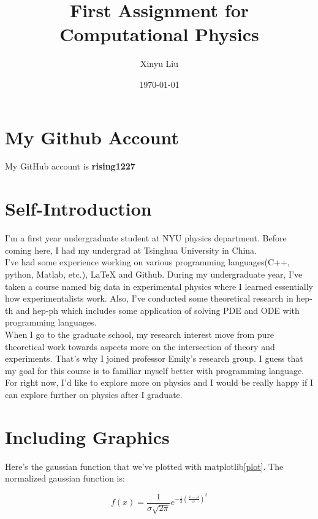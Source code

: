 \documentclass[letterpaper,12pt]{article}
\title{First Assignment for Computational Physics}
\date{\today}
\author{Xinyu Liu}
\begin{document}
\maketitle

\section{My Github Account}

My GitHub account is \textbf{rising1227}

\section{Self-Introduction}

    I'm a first year undergraduate student at NYU physics department. Before coming here, I had my undergrad at Tsinghua University in China.\\
    I've had some experience working on various programming languages(C++, python, Matlab, etc.), LaTeX and Github. During my undergraduate year, I've taken a course named big data in experimental physics where I learned essentially how experimentalists work. Also, I've conducted some theoretical research in hep-th and hep-ph which includes some application of solving PDE and ODE with programming languages.\\
    When I go to the graduate school, my research interest move from pure theoretical work towards aspects more on the intersection of theory and experiments. That's why I joined professor Emily's research group. I guess that my goal for this course is to familiar myself better with programming language. For right now, I'd like to explore more on physics and I would be really happy if I can explore further on physics after I graduate.




\newpage
\section{Including Graphics}

Here's the gaussian function that we've plotted with matplotlib\ref{plot}. The normalized gaussian function is:

\begin{equation}
    f(x) = \frac{1}{\sigma \sqrt{2\pi}} e^{-\frac{1}{2} (\frac{x-\mu}{\sigma})^2}
\end{equation}
\end{document}
